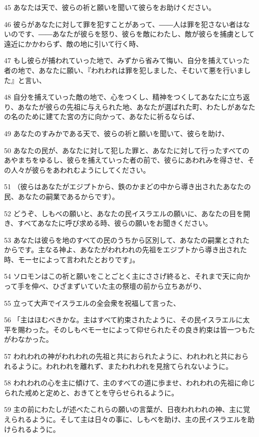 \par 45 あなたは天で、彼らの祈と願いを聞いて彼らをお助けください。
\par 46 彼らがあなたに対して罪を犯すことがあって、――人は罪を犯さない者はないのです、――あなたが彼らを怒り、彼らを敵にわたし、敵が彼らを捕虜として遠近にかかわらず、敵の地に引いて行く時、
\par 47 もし彼らが捕われていった地で、みずから省みて悔い、自分を捕えていった者の地で、あなたに願い、『われわれは罪を犯しました、そむいて悪を行いました』と言い、
\par 48 自分を捕えていった敵の地で、心をつくし、精神をつくしてあなたに立ち返り、あなたが彼らの先祖に与えられた地、あなたが選ばれた町、わたしがあなたの名のために建てた宮の方に向かって、あなたに祈るならば、
\par 49 あなたのすみかである天で、彼らの祈と願いを聞いて、彼らを助け、
\par 50 あなたの民が、あなたに対して犯した罪と、あなたに対して行ったすべてのあやまちをゆるし、彼らを捕えていった者の前で、彼らにあわれみを得させ、その人々が彼らをあわれむようにしてください。
\par 51 （彼らはあなたがエジプトから、鉄のかまどの中から導き出されたあなたの民、あなたの嗣業であるからです）。
\par 52 どうぞ、しもべの願いと、あなたの民イスラエルの願いに、あなたの目を開き、すべてあなたに呼び求める時、彼らの願いをお聞きください。
\par 53 あなたは彼らを地のすべての民のうちから区別して、あなたの嗣業とされたからです。主なる神よ、あなたがわれわれの先祖をエジプトから導き出された時、モーセによって言われたとおりです」。
\par 54 ソロモンはこの祈と願いをことごとく主にささげ終ると、それまで天に向かって手を伸べ、ひざまずいていた主の祭壇の前から立ちあがり、
\par 55 立って大声でイスラエルの全会衆を祝福して言った、
\par 56 「主はほむべきかな。主はすべて約束されたように、その民イスラエルに太平を賜わった。そのしもべモーセによって仰せられたその良き約束は皆一つもたがわなかった。
\par 57 われわれの神がわれわれの先祖と共におられたように、われわれと共におられるように。われわれを離れず、またわれわれを見捨てられないように。
\par 58 われわれの心を主に傾けて、主のすべての道に歩ませ、われわれの先祖に命じられた戒めと定めと、おきてとを守らせられるように。
\par 59 主の前にわたしが述べたこれらの願いの言葉が、日夜われわれの神、主に覚えられるように。そして主は日々の事に、しもべを助け、主の民イスラエルを助けられるように。

